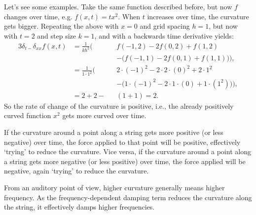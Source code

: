 Let's see some examples. Take the same function described before, but now $f$ changes over time, e.g. $f(x, t)=tx^2$. When $t$ increases over time, the curvature gets bigger. Repeating the above with $x=0$ and grid spacing $h = 1$, but now with $t=2$ and step size $k=1$, and with a backwards time derivative yields:
  \begin{alignat*}{3}
    \delta_{t-}\delta_{xx}f(x,t) &= \frac{1}{kh^2}\bigg(&&f(-1, 2) - 2f(0, 2) + f(1, 2) \\
    & &&- \Big(f(-1, 1) - 2f(0, 1) + f(1, 1)\Big)\bigg),\\
    & = \frac{1}{1\cdot 1^2}\bigg(&&2\cdot(-1)^2-2\cdot2\cdot(0)^2+2\cdot1^2\\
    & &&-\Big(1\cdot(-1)^2-2\cdot1\cdot(0)+1\cdot(1^2)\Big)\Bigg),\\
    &=2+2-&&(1+1)=2.
  \end{alignat*}
So the rate of change of the curvature is positive, i.e., the already positively curved function $x^2$ gets more curved over time.

If the curvature around a point along a string gets more positive (or less negative) over time, the force applied to that point will be positive, effectively `trying' to reduce the curvature. Vice versa, if the curvature around a point along a string gets more negative (or less positive) over time, the force applied will be negative, again `trying' to reduce the curvature. 

From an auditory point of view, higher curvature generally means higher frequency. As the frequency-dependent damping term reduces the curvature along the string, it effectively damps higher frequencies.
 
